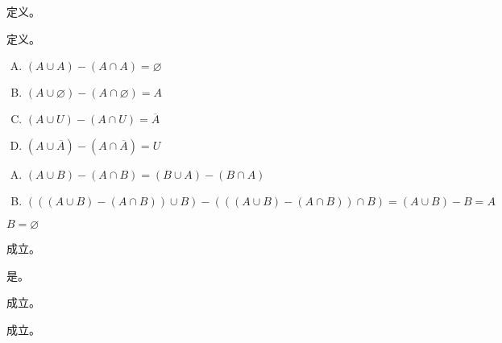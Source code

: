 {{        %
        \begin{practices}
            定义。
        \end{practices}

        \begin{practices}
            定义。
        \end{practices}

        \begin{practices}
            \begin{enumerate}[A.]
                \item $(A \cup A) - (A \cap A) = \varnothing$
                \item $(A \cup \varnothing) - (A \cap \varnothing) = A$
                \item $(A \cup U) - (A \cap U) = \overline{A}$
                \item $(A \cup \overline{A}) - (A \cap \overline{A}) = U$
            \end{enumerate}
        \end{practices}

        \begin{practices}
            \begin{enumerate}[A.]
                \item $(A \cup B) - (A \cap B) = (B \cup A) - (B \cap A)$
                \item $(((A \cup B) - (A \cap B)) \cup B) - (((A \cup B) - (A \cap B)) \cap B) = (A \cup B) - B = A$
            \end{enumerate}
        \end{practices}

        \begin{practices}
            $B = \varnothing$
        \end{practices}

        \begin{practices}
            成立。
        \end{practices}

        \begin{practices}
            是。
        \end{practices}

        \begin{practices}
            成立。
        \end{practices}

        \begin{practices}
            成立。
        \end{practices}

}}

